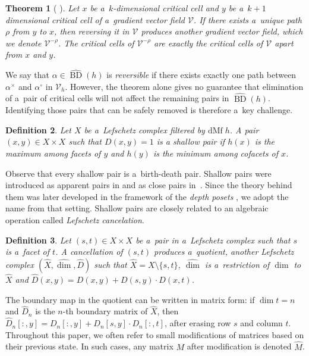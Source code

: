 \documentclass[a4paper,12pt, USenglish,cleveref,autoref,thm-restate]{article}
\newtheorem{theorem}{Theorem}
\newtheorem{definition}[theorem]{Definition}
\newcommand{\mf}{h}
\DeclareMathOperator{\bd}{BD}
\newcommand{\upbd}{\hat{\bd}}
\newcommand{\dmf}{\text{dMf}}
\newcommand{\mB}{D}
\newcommand{\hmB}{D}
\newcommand{\hmBaft}{\hat{\mB}}
\newcommand{\cx}{x}
\newcommand{\cy}{y}
\newcommand{\bth}[1]{#1^\circ}
\newcommand{\dth}[1]{#1^{\!\times}}
\newcommand{\bds}{\alpha}
\newcommand{\cV}{\mathcal{V}}
\begin{document}
\begin{theorem}[{\cite[Theorem~9.1]{Forman2002}} ]\label{thm:reversing}
    Let $\cx$ be a~$k$-dimensional critical cell and $\cy$ be a~$k+1$ dimensional critical cell of a~gradient vector field $\cV$. If there exists a~unique path $\rho$ from $\cy$ to $\cx$, then reversing it in $\cV$ produces another gradient vector field, which we denote $\cV^{-\rho}$. The critical cells of $\cV^{-\rho}$ are exactly the critical cells of $\cV$ apart from $\cx$ and $\cy$.
\end{theorem}

    
\noindent We say that $\bds \in \upbd(\mf)$ is \emph{reversible} if there exists exactly one path between $\dth\bds$ and $\bth\bds$ in $\cV_{\mf}$. However, the theorem alone gives no guarantee that elimination of a~pair of critical cells will not affect the remaining pairs in $\upbd(h)$. Identifying those pairs that can be safely removed is therefore a~key challenge. 

\begin{definition}
Let $X$ be a~Lefschetz complex filtered by $\dmf \; \mf$. 
A pair $(\cx,\cy) \in X \times X$ such that $\hmB(\cx,\cy) = 1$ is a \emph{shallow pair} if $\mf(\cx)$ is the maximum among facets of $y$ and $\mf(\cy)$ is the minimum among cofacets of $\cx$.
\end{definition}

\noindent Observe that every shallow pair is a~birth-death pair. Shallow pairs were introduced as apparent pairs in \cite{Bauer2021} and as close pairs in~\cite{DeRoSh2015}. Since the theory behind them was later developed in the framework of the \emph{depth posets} \cite{TransDepth}, we adopt the name from that setting. Shallow pairs are closely related to an algebraic operation called \emph{Lefschetz cancelation}.

\begin{definition}\label{def:lefschetz-cancellation}
    Let $(s,t)\in X\times X$ be a~pair in a~Lefschetz complex such that $s$ is a~facet of $t$.
    A \emph{cancellation} of $(s,t)$ produces a~\emph{quotient}, another Lefschetz complex $(\hat{X},\hat{\dim},\hat{\mB})$ such that $\hat{X}=X\setminus \{s,t\}$, $\hat{\dim}$ is a~restriction of $\dim$ to $\hat{X}$ and $\hat{\mB}(x,y) = \hmB(x,y) + \hmB(s,y)\cdot\hmB(x,t)$.
\end{definition}

\noindent The boundary map in the quotient can be written in matrix form: if $\dim t = n$ and $\hmBaft_{n}$ is the $n$-th boundary matrix of $\hat{X}$,  then $\hmBaft_{n}[:,\cy] = \hmB_{n}[:,\cy] + \hmB_{n}[s,\cy] \cdot \hmB_{n}[:,t]$, after erasing row $s$ and column $t$. Throughout this paper, we often refer to small modifications of matrices based on their previous state. In such cases, any matrix $M$ after modification is denoted $\hat{M}$.
\end{document}
